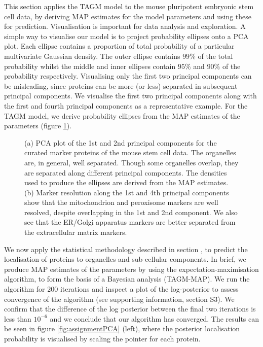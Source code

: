 \documentclass[10pt,letterpaper]{article}\usepackage[]{graphicx}\usepackage[]{color}
\begin{document}
This section applies the TAGM model to the mouse pluripotent embryonic
stem cell data, by deriving MAP estimates for the model parameters and
using these for prediction.  Visualisation is important for data
analysis and exploration. A simple way to visualise our model is to
project probability ellipses onto a PCA plot. Each ellipse contains a
proportion of total probability of a particular multivariate Gaussian
density.  The outer ellipse contains $99\%$ of the total probability
whilst the middle and inner ellipses contain $95\%$ and $90\%$ of the
probability respectively. Visualising only the first two principal
components can be misleading, since proteins can be more (or less)
separated in subsequent principal components.  We visualise the first
two principal components along with the first and fourth principal
components as a representative example. For the TAGM model, we derive
probability ellipses from the MAP estimates of the parameters (figure
\ref{figure::pcaellipse}).




\begin{figure}[!p]
  \begin{subfigure}[t]{0.45\textwidth}
    \centering

\end{subfigure}%
\hfill
\begin{subfigure}[t]{0.45\textwidth}
        \centering

\end{subfigure}
  \centering
  \caption{ (a) PCA plot of the 1st and 2nd principal components for
    the curated marker proteins of the mouse stem cell data. The
    organelles are, in general, well separated. Though some organelles
    overlap, they are separated along different principal
    components. The densities used to produce the ellipses are derived
    from the MAP estimates. (b) Marker resolution along the 1st and
    4th principal components show that the mitochondrion and
    peroxisome markers are well resolved, despite overlapping in the
    1st and 2nd component.  We also see that the ER/Golgi apparatus
    markers are better separated from the extracellular matrix
    markers.}
\label{figure::pcaellipse}
\end{figure}


We now apply the statistical methodology described in section
, to predict the localisation of proteins to
organelles and sub-cellular components. In brief, we produce MAP
estimates of the parameters by using the expectation-maximisation
algorithm, to form the basis of a Bayesian analysis (TAGM-MAP).  We
run the algorithm for $200$ iterations and inspect a plot of the
log-posterior to assess convergence of the algorithm (see supporting
information, section S3). We confirm that the difference of the log
posterior between the final two iterations is less than $10^{-6}$ and
we conclude that our algorithm has converged. The results can be seen
in figure \ref{fig:assignmentPCA} (left), where the posterior
localisation probability is visualised by scaling the pointer for each
protein.
\end{document}
